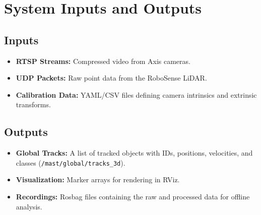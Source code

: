 \documentclass[12pt,a4paper]{report}
\begin{document}
\section{System Inputs and Outputs}
\subsection{Inputs}
\begin{itemize}
    \item \textbf{RTSP Streams:} Compressed video from Axis cameras.
    \item \textbf{UDP Packets:} Raw point data from the RoboSense LiDAR.
    \item \textbf{Calibration Data:} YAML/CSV files defining camera intrinsics and extrinsic transforms.
\end{itemize}

\subsection{Outputs}
\begin{itemize}
    \item \textbf{Global Tracks:} A list of tracked objects with IDs, positions, velocities, and classes (\texttt{/mast/global/tracks\_3d}).
    \item \textbf{Visualization:} Marker arrays for rendering in RViz.
    \item \textbf{Recordings:} Rosbag files containing the raw and processed data for offline analysis.
\end{itemize}
\end{document}
